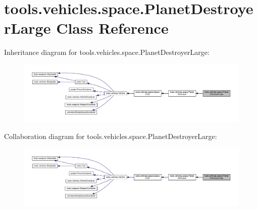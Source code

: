 \hypertarget{classtools_1_1vehicles_1_1space_1_1_planet_destroyer_large}{}\section{tools.\+vehicles.\+space.\+Planet\+Destroyer\+Large Class Reference}
\label{classtools_1_1vehicles_1_1space_1_1_planet_destroyer_large}


Inheritance diagram for tools.\+vehicles.\+space.\+Planet\+Destroyer\+Large\+:
\nopagebreak
\begin{figure}[H]
\begin{center}
\leavevmode
\includegraphics[width=350pt]{classtools_1_1vehicles_1_1space_1_1_planet_destroyer_large__inherit__graph}
\end{center}
\end{figure}


Collaboration diagram for tools.\+vehicles.\+space.\+Planet\+Destroyer\+Large\+:
\nopagebreak
\begin{figure}[H]
\begin{center}
\leavevmode
\includegraphics[width=350pt]{classtools_1_1vehicles_1_1space_1_1_planet_destroyer_large__coll__graph}
\end{center}
\end{figure}
